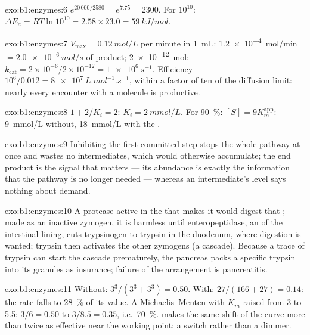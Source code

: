\begin{solution}{exo:b1:enzymes:6}
$e^{20\,000/2580} = e^{7.75} = 2300$. For $10^{10}$: $\Delta E_a =
RT\ln 10^{10} = 2.58\times 23.0 = \qty{59}{kJ/mol}$.
\end{solution}

\begin{solution}{exo:b1:enzymes:7}
$V_{\max} = \qty{0.12}{mol/L}$ per minute in \qty{1}{mL}:
\qty{1.2e-4}{mol/min} $= \qty{2.0e-6}{mol/s}$ of product; 
\qty{2e-12}{mol}: $k_{\text{cat}} = 2\times 10^{-6}/2\times 10^{-12} =
\qty{1e6}{s^{-1}}$. Efficiency $10^6/0.012 = \qty{8e7}{L.mol^{-1}.s^{-1}}$,
within a factor of ten of the diffusion limit: nearly every encounter
with a  molecule is productive.
\end{solution}

\begin{solution}{exo:b1:enzymes:8}
$1 + 2/K_i = 2$: $K_i = \qty{2}{mmol/L}$. For \qty{90}{\%}:
$[S] = 9K_m^{\text{app}}$: \qty{9}{mmol/L} without, \qty{18}{mmol/L}
with the .
\end{solution}

\begin{solution}{exo:b1:enzymes:9}
Inhibiting the first committed step stops the whole pathway at once
and wastes no intermediates, which would otherwise accumulate; the
end product is the signal that matters --- its abundance is exactly
the information that the pathway is no longer needed --- whereas an
intermediate's level says nothing about demand.
\end{solution}

\begin{solution}{exo:b1:enzymes:10}
A protease active in the  that makes it would digest that ;
made as an inactive zymogen, it is harmless until enteropeptidase, an
 of the intestinal lining, cuts trypsinogen to trypsin in the
duodenum, where digestion is wanted; trypsin then activates the other
zymogens (a cascade). Because a trace of trypsin can start the cascade
prematurely, the pancreas packs a specific trypsin  into its
granules as insurance; failure of the arrangement is pancreatitis.
\end{solution}

\begin{solution}{exo:b1:enzymes:11}
Without: $3^3/(3^3 + 3^3) = 0.50$. With: $27/(166 + 27) = 0.14$: the
rate falls to \qty{28}{\%} of its value. A Michaelis--Menten 
with $K_m$ raised from 3 to 5.5: $3/6 = 0.50$ to $3/8.5 = 0.35$, i.e.\
\qty{70}{\%}.  makes the same shift of the curve more
than twice as effective near the working point: a switch rather than
a dimmer.
\end{solution}

